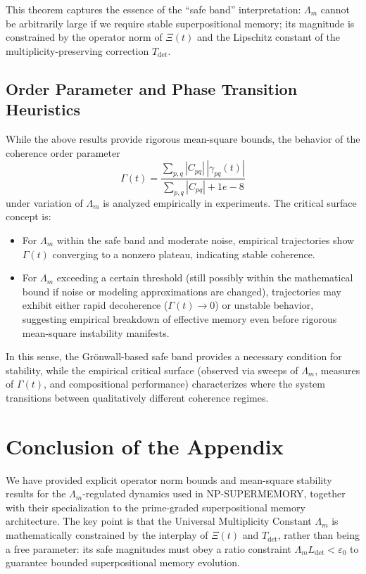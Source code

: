 \documentclass[11pt]{article}
\begin{document}
This theorem captures the essence of the ``safe band'' interpretation: $\Lambda_m$ cannot be arbitrarily large if we require stable superpositional memory; its magnitude is constrained by the operator norm of $\Xi(t)$ and the Lipschitz constant of the multiplicity-preserving correction $T_{\det}$.

\subsection{Order Parameter and Phase Transition Heuristics}

While the above results provide rigorous mean-square bounds, the behavior of the coherence order parameter
\[
\Gamma(t) = \frac{\sum_{p,q}|C_{pq}|\,|\gamma_{pq}(t)|}{\sum_{p,q}|C_{pq}| + 1e-8}
\]
under variation of $\Lambda_m$ is analyzed empirically in experiments. The critical surface concept is:

\begin{itemize}
\item For $\Lambda_m$ within the safe band and moderate noise, empirical trajectories show $\Gamma(t)$ converging to a nonzero plateau, indicating stable coherence.
\item For $\Lambda_m$ exceeding a certain threshold (still possibly within the mathematical bound if noise or modeling approximations are changed), trajectories may exhibit either rapid decoherence ($\Gamma(t)\to 0$) or unstable behavior, suggesting empirical breakdown of effective memory even before rigorous mean-square instability manifests.
\end{itemize}

In this sense, the Grönwall-based safe band provides a necessary condition for stability, while the empirical critical surface (observed via sweeps of $\Lambda_m$, measures of $\Gamma(t)$, and compositional performance) characterizes where the system transitions between qualitatively different coherence regimes.

\section{Conclusion of the Appendix}

We have provided explicit operator norm bounds and mean-square stability results for the $\Lambda_m$-regulated dynamics used in NP-SUPERMEMORY, together with their specialization to the prime-graded superpositional memory architecture. The key point is that the Universal Multiplicity Constant $\Lambda_m$ is mathematically constrained by the interplay of $\Xi(t)$ and $T_{\det}$, rather than being a free parameter: its safe magnitudes must obey a ratio constraint $\Lambda_m L_{\det}<\varepsilon_0$ to guarantee bounded superpositional memory evolution.

\nocite{*}
  
  
\end{document}
